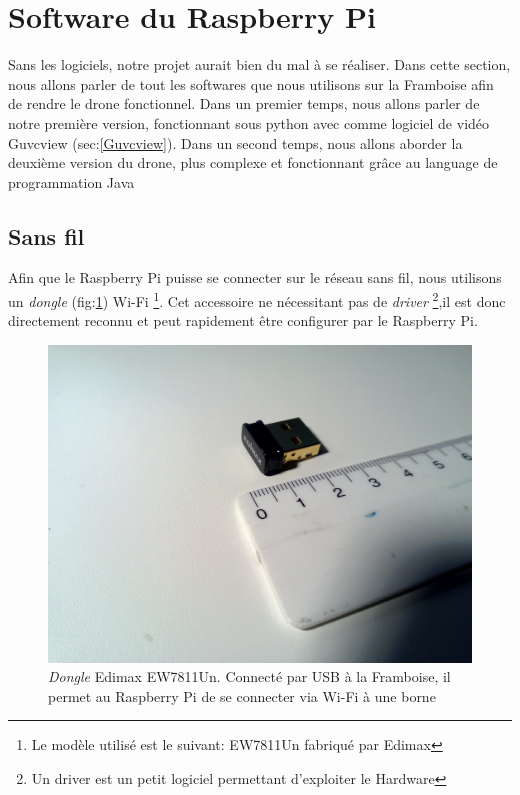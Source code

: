 \documentclass[a4paper,12pt]{report}
\begin{document}
{\section{Software du Raspberry Pi}
Sans les logiciels, notre projet aurait bien du mal à se réaliser. Dans cette section, nous allons parler de tout les softwares que nous utilisons sur la Framboise afin de rendre le drone fonctionnel. Dans un premier temps, nous allons parler de notre première version, fonctionnant sous python avec comme logiciel de vidéo Guvcview (sec:\ref{Guvcview}). Dans un second temps, nous allons aborder la deuxième version du drone, plus complexe et fonctionnant grâce au language de programmation Java





\subsection{Sans fil}

Afin que le Raspberry Pi puisse se connecter sur le réseau sans fil, nous utilisons un \textit{dongle} (fig:\ref{Edimax}) Wi-Fi \footnote{Le modèle utilisé est le suivant: EW7811Un fabriqué par Edimax}. Cet accessoire ne nécessitant pas de \textit{driver} \footnote{Un driver est un petit logiciel permettant d'exploiter le Hardware},il est donc directement reconnu et peut rapidement être configurer par le Raspberry Pi. 
\begin{figure}[!h]
\begin{center}
\includegraphics[scale=0.38, trim=300 300 300 0, clip=true]{Edimax}
\caption{\textit{Dongle} Edimax EW7811Un. Connecté par USB à la Framboise, il permet au Raspberry Pi de se connecter via Wi-Fi à une borne\label{Edimax}}
\end{center}
\end{figure} 

}
\end{document}
